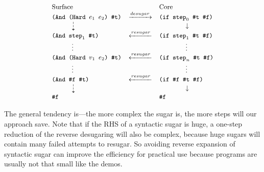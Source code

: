 \[
{\small
	\begin{array}{lcl}
	\text{Surface}&&\text{Core}\\
	\Code{(And (Hard $e_1$ $e_2$) \#t)}&\xrightarrow{desugar}&\Code{(if $\m{step}_0$ \#t \#f)}\\
	\qquad\quad\dashdownarrow& &\qquad\qquad\downarrow\\
	\Code{(And $\m{step}_1$ \#t)}&\xleftarrow{resugar}&\Code{(if $\m{step}_1$ \#t \#f)}\\
	\qquad\quad\vdots& &\qquad\qquad\vdots\\
	\Code{(And (Hard $v_1$ $e_2$) \#t)}&\xleftarrow{resugar}&\Code{(if $\m{step}_n$ \#t \#f)}\\
	\qquad\quad\vdots& &\qquad\qquad\vdots\\
	\Code{(And \#f \#t)}&\xleftarrow{resugar}& \Code{(if \#f \#t \#f)}\\
	\qquad\quad\dashdownarrow& &\qquad\qquad\downarrow\\
	\Code{\#f}&& \Code{\#f}\\
\end{array}
}
\]


The general tendency is---the more complex the sugar is, the more steps will our approach save. Note that if the RHS of a syntactic sugar is huge, a one-step reduction of the reverse desugaring will also be complex, because huge sugars will contain many failed attempts to resugar. So avoiding reverse expansion of syntactic sugar can improve the efficiency for practical use because programs are usually not that small like the demos.
